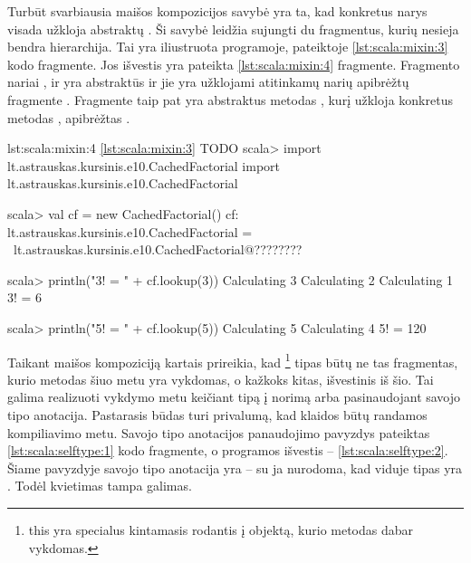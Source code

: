 \begin{scalacodelisting}
  \caption{Fragmentų hierarchijos modifikavimas.}
  \label{lst:scala:mixin:1}
\end{scalacodelisting}

\begin{scalainterpreterlisting}
  \caption{\ref{lst:scala:mixin:1} TODO}
  \label{lst:scala:mixin:2}
\end{scalainterpreterlisting}

Turbūt svarbiausia maišos kompozicijos savybė yra ta, kad konkretus
narys visada užkloja abstraktų
\cite[6]{scalable-component-abstractions}. Ši savybė leidžia
sujungti du fragmentus, kurių nesieja bendra hierarchija. Tai yra
iliustruota programoje, pateiktoje \ref{lst:scala:mixin:3} kodo
fragmente. Jos išvestis yra pateikta \ref{lst:scala:mixin:4}
fragmente. Fragmento  nariai
,  ir  yra abstraktūs
ir jie yra užklojami atitinkamų narių apibrėžtų fragmente
. Fragmente  taip pat yra
abstraktus metodas , kurį užkloja konkretus metodas
, apibrėžtas .

\begin{scalacodelisting}
  \caption{Maišos kompozicijos pavyzdys.}
  \label{lst:scala:mixin:3}
\end{scalacodelisting}

\begin{scalailisting}{lst:scala:mixin:4}{%
  \ref{lst:scala:mixin:3} TODO}
scala> import lt.astrauskas.kursinis.e10.CachedFactorial
import lt.astrauskas.kursinis.e10.CachedFactorial

scala> val cf = new CachedFactorial()
cf: lt.astrauskas.kursinis.e10.CachedFactorial = \
  lt.astrauskas.kursinis.e10.CachedFactorial@????????

scala> println("3! = " + cf.lookup(3))
Calculating 3
Calculating 2
Calculating 1
3! = 6

scala> println("5! = " + cf.lookup(5))
Calculating 5
Calculating 4
5! = 120

\end{scalailisting}

Taikant maišos kompoziciją kartais prireikia, kad
\footnote{this yra specialus kintamasis rodantis į
objektą, kurio metodas dabar vykdomas.} tipas būtų ne tas fragmentas,
kurio metodas šiuo metu yra vykdomas, o kažkoks kitas, išvestinis
iš šio. Tai galima realizuoti vykdymo metu keičiant \scala{this}
tipą į norimą arba pasinaudojant \plangname{Scala} savojo tipo
anotacija. Pastarasis būdas turi privalumą, kad klaidos būtų randamos
kompiliavimo metu. Savojo tipo anotacijos panaudojimo pavyzdys pateiktas
\ref{lst:scala:selftype:1} kodo fragmente, o programos išvestis
– \ref{lst:scala:selftype:2}. Šiame pavyzdyje savojo tipo anotacija
yra \scala{this: Node =>} – su ja nurodoma, kad \scala{BaseNode}
viduje \scala{this} tipas yra \scala{Node}. Todėl kvietimas
 tampa galimas.

